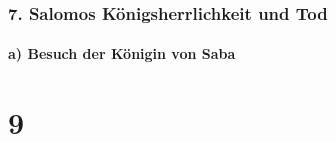 \hypertarget{salomos-kuxf6nigsherrlichkeit-und-tod}{%
\subsubsection{7. Salomos Königsherrlichkeit und
Tod}\label{salomos-kuxf6nigsherrlichkeit-und-tod}}

\hypertarget{a-besuch-der-kuxf6nigin-von-saba}{%
\paragraph{a) Besuch der Königin von
Saba}\label{a-besuch-der-kuxf6nigin-von-saba}}

\hypertarget{section-8}{%
\section{9}\label{section-8}}

